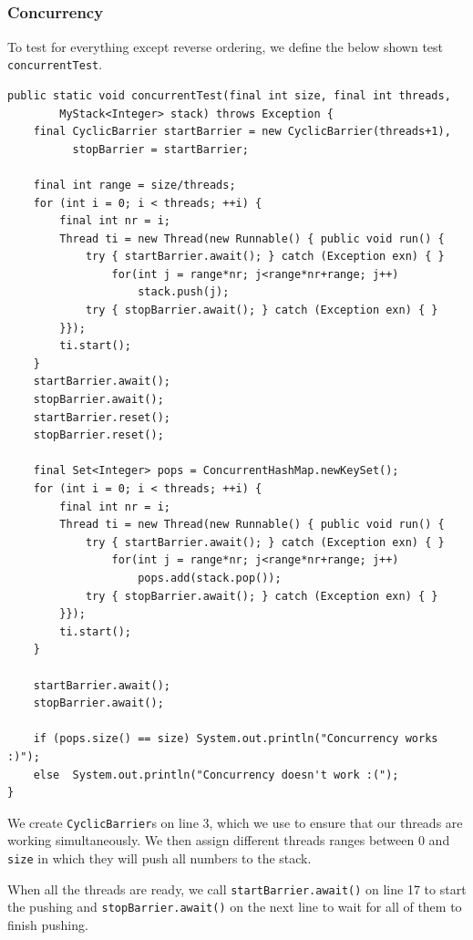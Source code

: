\documentclass[a5paper]{article}
\begin{document}
\subsection{}
\subsubsection{Concurrency}
To test for everything except reverse ordering, we define the below shown test \texttt{concurrentTest}.
\begin{lstlisting}
public static void concurrentTest(final int size, final int threads,  
        MyStack<Integer> stack) throws Exception {
    final CyclicBarrier startBarrier = new CyclicBarrier(threads+1), 
          stopBarrier = startBarrier;

    final int range = size/threads;
    for (int i = 0; i < threads; ++i) {
        final int nr = i;
        Thread ti = new Thread(new Runnable() { public void run() {
            try { startBarrier.await(); } catch (Exception exn) { }
                for(int j = range*nr; j<range*nr+range; j++)
                    stack.push(j);
            try { stopBarrier.await(); } catch (Exception exn) { }
        }});
        ti.start();
    }
    startBarrier.await();
    stopBarrier.await();
    startBarrier.reset();
    stopBarrier.reset();

    final Set<Integer> pops = ConcurrentHashMap.newKeySet();
    for (int i = 0; i < threads; ++i) {
        final int nr = i;
        Thread ti = new Thread(new Runnable() { public void run() {
            try { startBarrier.await(); } catch (Exception exn) { }
                for(int j = range*nr; j<range*nr+range; j++)
                    pops.add(stack.pop());
            try { stopBarrier.await(); } catch (Exception exn) { }
        }});
        ti.start();
    }

    startBarrier.await();
    stopBarrier.await();

    if (pops.size() == size) System.out.println("Concurrency works :)");
    else  System.out.println("Concurrency doesn't work :(");
}
\end{lstlisting}

We create \texttt{CyclicBarrier}s on line 3, which we use to ensure that our threads are working simultaneously. 
We then assign different threads ranges between 0 and \texttt{size} in which they will push all numbers to the stack.

When all the threads are ready, we call \texttt{startBarrier.await()} on line 17 to start the pushing and \texttt{stopBarrier.await()} on the next line
to wait for all of them to finish pushing. 
\end{document}
